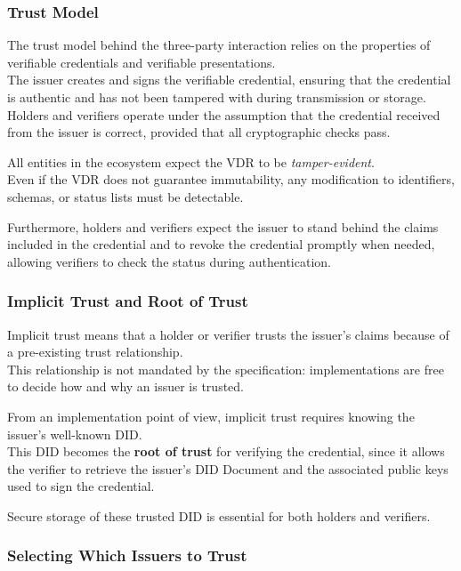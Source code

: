 \subsubsection {Trust Model}

The trust model behind the three-party interaction relies on the properties of verifiable credentials and verifiable presentations.\\  
The issuer creates and signs the verifiable credential, ensuring that the
credential is authentic and has not been tampered with during transmission or storage. \\
Holders and verifiers operate under the assumption that the credential received from the issuer is correct, provided that all cryptographic checks pass.
\medskip

\noindent
All entities in the ecosystem expect the VDR to be \textit{tamper-evident}. \\
Even if the VDR does not guarantee immutability, any modification to identifiers, schemas, or status lists must be detectable.
\medskip

\noindent
Furthermore, holders and verifiers expect the issuer to stand behind the claims included in the credential and to revoke the credential promptly when needed, allowing verifiers to check the status during authentication.

\subsubsection*{Implicit Trust and Root of Trust}

Implicit trust means that a holder or verifier trusts the issuer’s claims because of a pre-existing trust relationship. \\
This relationship is not mandated by the specification: implementations are free to decide how and why an issuer is trusted.
\medskip

\noindent
From an implementation point of view, implicit trust requires knowing the
issuer’s well-known DID.\\
This DID becomes the \textbf{root of trust} for verifying the credential, since it allows the verifier to retrieve the issuer’s DID Document and the associated public keys used to sign the credential.
\medskip

\noindent
Secure storage of these trusted DID is essential for both holders and verifiers.

\subsubsection*{Selecting Which Issuers to Trust}

